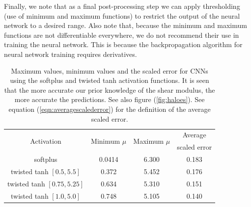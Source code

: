 \documentclass[12pt]{article}
\begin{document}
Finally, we note that as a final post-processing step we can apply thresholding (use of minimum and maximum functions) to restrict the output of the neural network to a desired range. Also note that, because the minimum and maximum functions are not differentiable everywhere, we do not recommend their use in training the neural network. This is because the backpropagation algorithm for neural network training requires derivatives.
\begin{table}
  \centering
  \begin{tabular}{|c|c|c|c|}
    \hline
    \multirow{2}{*}{Activation}  & \multirow{2}{*}{Minimum $\mu$} & \multirow{2}{*}{Maximum $\mu$} & {Average}\\
                                 &                                &                                & scaled error\\
    \hline
    softplus                 & 0.0414       & 6.300            & 0.183\\
    \hline
    twisted tanh $[0.5, 5.5]$  & 0.372        & 5.452          & 0.176\\     
    \hline
    twisted tanh $[0.75,5.25]$ & 0.634        & 5.310          & 0.151\\
    \hline
    twisted tanh $[1.0, 5.0]$  & 0.748        & 5.105          & 0.140\\
    \hline
  \end{tabular}
  \caption{\label{table:muminmax} Maximum values, minimum values and the scaled error for CNNs using the softplus and twisted tanh activation functions. It is seen that the more accurate our prior knowledge of the shear modulus, the more accurate the predictions. See also figure (\ref{fig:haloes}). See equation (\ref{eqn:averagescalederror}) for the definition of the average scaled error.}
\end{table}
\end{document}
